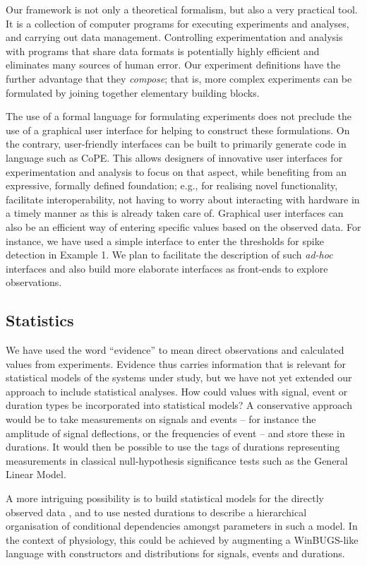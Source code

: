 Our framework is not only a theoretical formalism, but also a very
practical tool. It is a collection of computer programs for executing
experiments and analyses, and carrying out data
management. Controlling experimentation and analysis with programs
that share data formats is potentially highly efficient and eliminates
many sources of human error. Our experiment definitions have the
further advantage that they \emph{compose}; that is, more complex
experiments can be formulated by joining together elementary building
blocks. 

The use of a formal language for formulating experiments does not preclude the
use of a graphical user interface for helping to construct these formulations.
On the contrary, user-friendly interfaces can be built to primarily generate
code in language such as CoPE. This allows designers of innovative user
interfaces for experimentation and analysis to focus on that aspect, while
benefiting from an expressive, formally defined foundation; e.g., for
realising novel functionality, facilitate interoperability, not having to
worry about interacting with hardware in a timely manner as this is already
taken care of. Graphical user interfaces can also be an efficient way of
entering specific values based on the observed data. For instance, we have
used a simple interface to enter the thresholds for spike detection in Example
1. We plan to facilitate the description of such \emph{ad-hoc} interfaces and
also build more elaborate interfaces as front-ends to explore observations.

\subsection*{Statistics}

We have used the word ``evidence'' to mean direct observations and
calculated values from experiments. Evidence thus carries information
that is relevant for statistical models of the systems under study,
but we have not yet extended our approach to include statistical
analyses. How could values with signal, event or duration types be
incorporated into statistical models? A conservative approach would be to
take measurements on signals and events -- for instance the amplitude
of signal deflections, or the frequencies of event -- and store these in
durations. It would then be possible to use the tags of durations
representing measurements in classical null-hypothesis significance
tests such as the General Linear Model. 

A more intriguing possibility is to build statistical models for the
directly observed data \citep{Daniell1991}, and to use nested
durations to describe a hierarchical organisation \citep{Rouder2003}
of conditional dependencies amongst parameters in such a model. In the
context of physiology, this could be achieved by augmenting a
WinBUGS-like \citep{Gilks1994} language with constructors and
distributions for signals, events and durations.


